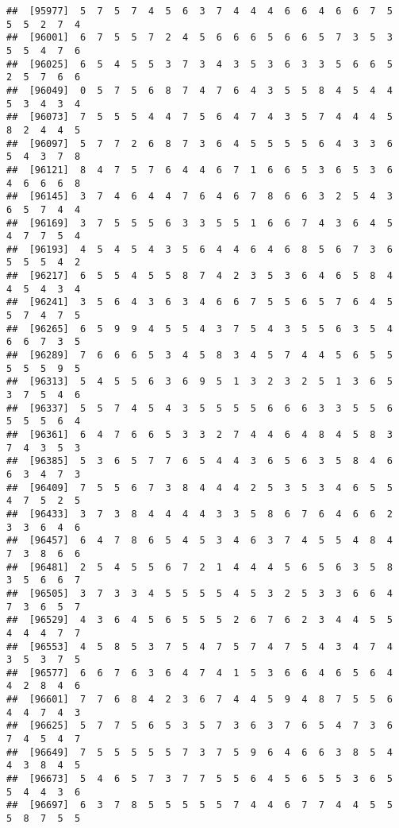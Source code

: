 \documentclass[
]{book}
\begin{document}
\begin{verbatim}
##  [95977]  5  7  5  7  4  5  6  3  7  4  4  4  6  6  4  6  6  7  5  5  5  2  7  4
##  [96001]  6  7  5  5  7  2  4  5  6  6  6  5  6  6  5  7  3  5  3  5  5  4  7  6
##  [96025]  6  5  4  5  5  3  7  3  4  3  5  3  6  3  3  5  6  6  5  2  5  7  6  6
##  [96049]  0  5  7  5  6  8  7  4  7  6  4  3  5  5  8  4  5  4  4  5  3  4  3  4
##  [96073]  7  5  5  5  4  4  7  5  6  4  7  4  3  5  7  4  4  4  5  8  2  4  4  5
##  [96097]  5  7  7  2  6  8  7  3  6  4  5  5  5  5  6  4  3  3  6  5  4  3  7  8
##  [96121]  8  4  7  5  7  6  4  4  6  7  1  6  6  5  3  6  5  3  6  4  6  6  6  8
##  [96145]  3  7  4  6  4  4  7  6  4  6  7  8  6  6  3  2  5  4  3  6  5  7  4  4
##  [96169]  3  7  5  5  5  6  3  3  5  5  1  6  6  7  4  3  6  4  5  4  7  7  5  4
##  [96193]  4  5  4  5  4  3  5  6  4  4  6  4  6  8  5  6  7  3  6  5  5  5  4  2
##  [96217]  6  5  5  4  5  5  8  7  4  2  3  5  3  6  4  6  5  8  4  4  5  4  3  4
##  [96241]  3  5  6  4  3  6  3  4  6  6  7  5  5  6  5  7  6  4  5  5  7  4  7  5
##  [96265]  6  5  9  9  4  5  5  4  3  7  5  4  3  5  5  6  3  5  4  6  6  7  3  5
##  [96289]  7  6  6  6  5  3  4  5  8  3  4  5  7  4  4  5  6  5  5  5  5  5  9  5
##  [96313]  5  4  5  5  6  3  6  9  5  1  3  2  3  2  5  1  3  6  5  3  7  5  4  6
##  [96337]  5  5  7  4  5  4  3  5  5  5  5  6  6  6  3  3  5  5  6  5  5  5  6  4
##  [96361]  6  4  7  6  6  5  3  3  2  7  4  4  6  4  8  4  5  8  3  7  4  3  5  3
##  [96385]  5  3  6  5  7  7  6  5  4  4  3  6  5  6  3  5  8  4  6  6  3  4  7  3
##  [96409]  7  5  5  6  7  3  8  4  4  4  2  5  3  5  3  4  6  5  5  4  7  5  2  5
##  [96433]  3  7  3  8  4  4  4  4  3  3  5  8  6  7  6  4  6  6  2  3  3  6  4  6
##  [96457]  6  4  7  8  6  5  4  5  3  4  6  3  7  4  5  5  4  8  4  7  3  8  6  6
##  [96481]  2  5  4  5  5  6  7  2  1  4  4  4  5  6  5  6  3  5  8  3  5  6  6  7
##  [96505]  3  7  3  3  4  5  5  5  5  4  5  3  2  5  3  3  6  6  4  7  3  6  5  7
##  [96529]  4  3  6  4  5  6  5  5  5  2  6  7  6  2  3  4  4  5  5  4  4  4  7  7
##  [96553]  4  5  8  5  3  7  5  4  7  5  7  4  7  5  4  3  4  7  4  3  5  3  7  5
##  [96577]  6  6  7  6  3  6  4  7  4  1  5  3  6  6  4  6  5  6  4  4  2  8  4  6
##  [96601]  7  7  6  8  4  2  3  6  7  4  4  5  9  4  8  7  5  5  6  4  4  7  4  3
##  [96625]  5  7  7  5  6  5  3  5  7  3  6  3  7  6  5  4  7  3  6  7  4  5  4  7
##  [96649]  7  5  5  5  5  5  7  3  7  5  9  6  4  6  6  3  8  5  4  4  3  8  4  5
##  [96673]  5  4  6  5  7  3  7  7  5  5  6  4  5  6  5  5  3  6  5  5  4  4  3  6
##  [96697]  6  3  7  8  5  5  5  5  5  7  4  4  6  7  7  4  4  5  5  5  8  7  5  5

\end{verbatim}
\end{document}
